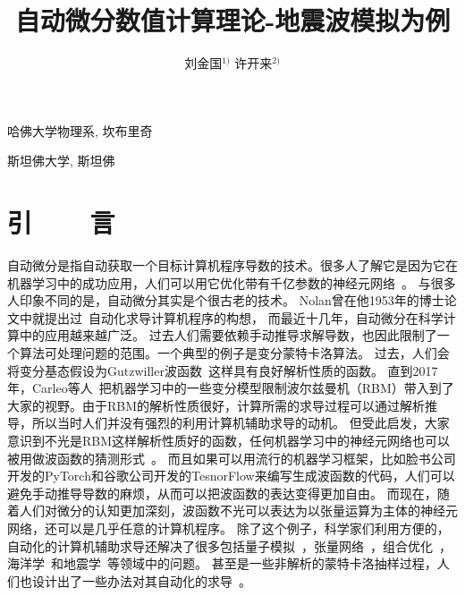\documentclass[A4,twoside,fontset=ubuntu,UTF8]{ctexart}
\begin{document}
\apsname

\title{自动微分数值计算理论-地震波模拟为例 \fivestar}%

\author{刘金国$^{1)}$ \quad 许开来$^{2)}$}

\address{1)}{哈佛大学物理系, 坎布里奇 }
\address{2)}{斯坦佛大学, 斯坦佛 }





\cfund{}




{}\baselineskip
\section{引~~~~言}
    自动微分是指自动获取一个目标计算机程序导数的技术。很多人了解它是因为它在机器学习中的成功应用，人们可以用它优化带有千亿参数的神经元网络~\cite{Rosset2019}。
与很多人印象不同的是，自动微分其实是个很古老的技术。
Nolan曾在他1953年的博士论文中就提出过~\cite{Nolan1953}自动化求导计算机程序的构想，
而最近十几年，自动微分在科学计算中的应用越来越广泛。
过去人们需要依赖手动推导求解导数，也因此限制了一个算法可处理问题的范围。一个典型的例子是变分蒙特卡洛算法。
过去，人们会将变分基态假设为Gutzwiller波函数~\cite{Gutzwiller1963}这样具有良好解析性质的函数。
直到2017年，Carleo等人~\cite{Carleo2017, Deng2017}把机器学习中的一些变分模型限制波尔兹曼机（RBM）带入到了大家的视野。由于RBM的解析性质很好，计算所需的求导过程可以通过解析推导，所以当时人们并没有强烈的利用计算机辅助求导的动机。
但受此启发，大家意识到不光是RBM这样解析性质好的函数，任何机器学习中的神经元网络也可以被用做波函数的猜测形式~\cite{Cai2018}。
而且如果可以用流行的机器学习框架，比如脸书公司开发的PyTorch和谷歌公司开发的TesnorFlow来编写生成波函数的代码，人们可以避免手动推导导数的麻烦，从而可以把波函数的表达变得更加自由。
而现在，随着人们对微分的认知更加深刻，波函数不光可以表达为以张量运算为主体的神经元网络，还可以是几乎任意的计算机程序。
    除了这个例子，科学家们利用方便的，自动化的计算机辅助求导还解决了很多包括量子模拟~\cite{Luo2019}，张量网络~\cite{Liao2019}，组合优化~\cite{Liu2020}，海洋学~\cite{Heimbach2005}和地震学~\cite{Symes2007,Zhu2020}等领域中的问题。
甚至是一些非解析的蒙特卡洛抽样过程，人们也设计出了一些办法对其自动化的求导~\cite{Zhang2019}。
\end{document}

